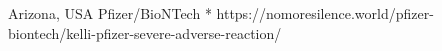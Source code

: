           {Arizona, USA}
          {}
          {Pfizer/BioNTech}
          {*}
          {
          }
          {https://nomoresilence.world/pfizer-biontech/kelli-pfizer-severe-adverse-reaction/}

